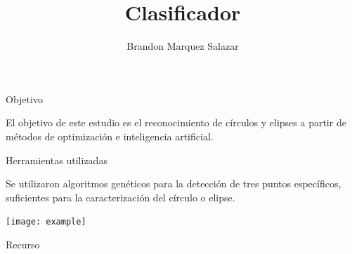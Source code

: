 \documentclass[12pt]{beamer}
\author{%
Brandon Marquez Salazar
}
\title{%
  Clasificador
}
\begin{document}
  \frame{\titlepage}
  \begin{frame}
    {\Large Objetivo}

    El objetivo de este estudio es el reconocimiento de círculos y elipses a partir de
    métodos de optimización e inteligencia artificial.

  \end{frame}
  \begin{frame}
    {\Large Herramientas utilizadas}

    Se utilizaron algoritmos genéticos para la detección de tres puntos específicos,
    suficientes para la caracterización del círculo o elipse.
    \begin{center}
    \texttt{[image: example]}
    \end{center}

  \end{frame}
  \begin{frame}
  {\Large Recurso}
  \printbibliography
  \end{frame}
\end{document}
